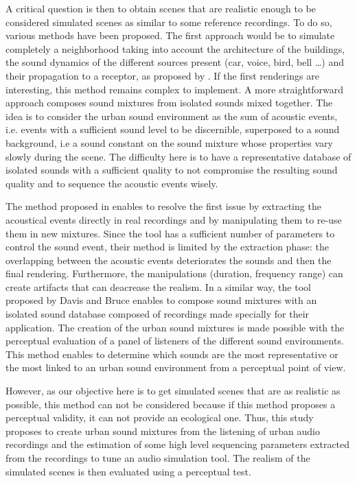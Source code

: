 \documentclass[11pt,letter]{article}
\begin{document}
A critical question is then to obtain scenes that are realistic enough to be considered simulated scenes as similar to some reference recordings. To do so, various methods have been proposed. The first approach would be to simulate completely a neighborhood taking into account the architecture of the buildings, the sound dynamics of the different sources present (car, voice, bird, bell \dots) and their propagation to a receptor, as proposed by \cite{cstb_simulation_2015}. If the first renderings are interesting, this method remains complex to implement.
A more straightforward approach composes sound mixtures from isolated sounds mixed together. The idea is to consider the urban sound environment as the sum of acoustic events, i.e. events with a sufficient sound level to be discernible, superposed to a sound background, i.e a sound constant on the sound mixture whose properties vary slowly during the scene. The difficulty here is to have a representative database of isolated sounds with a sufficient quality to not compromise the resulting sound quality and to sequence the acoustic events wisely.

The method proposed in \cite{misra_musical_2007} enables to resolve the first issue by extracting the acoustical events directly in real recordings and by manipulating them to re-use them in new mixtures. Since the tool has a sufficient number of parameters to control the sound event, their method is limited by the extraction phase: the overlapping between the acoustic events deteriorates the sounds and then the final rendering. Furthermore, the manipulations (duration, frequency range) can create artifacts that can deacrease the realism. In a similar way, the tool proposed by Davis and Bruce \cite{bruce_development_2009} enables to compose sound mixtures with an isolated sound database composed of recordings made specially for their application. The creation of the urban sound mixtures is made possible with the perceptual evaluation of a panel of listeners of the different sound environments. This method enables to determine which sounds are the most representative or the most linked to an urban sound environment from a perceptual point of view.

However, as our objective here is to get simulated scenes that are as realistic as possible, this method can not be considered because if this method proposes a perceptual validity, it can not provide an ecological one. Thus, this study proposes to create urban sound mixtures from the listening of urban audio recordings and the estimation of some high level sequencing parameters extracted from the recordings to tune an audio simulation tool. The realism of the simulated scenes is then evaluated using a perceptual test.
\end{document}
